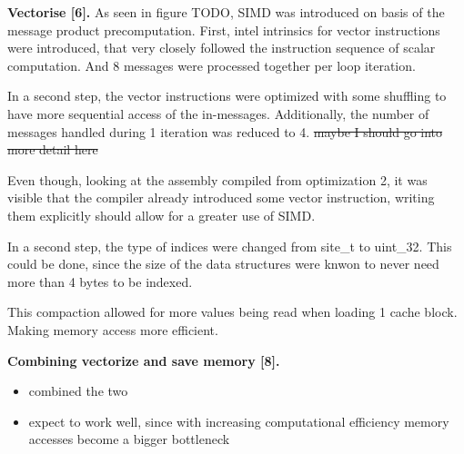 \documentclass[letterpaper]{article}
\newcommand{\mypar}[1]{{\bf #1.}}
\begin{document}
\mypar{Vectorise [6]}
As seen in figure TODO, SIMD was introduced on basis of the message product precomputation. First, intel intrinsics for vector instructions were introduced, that very closely followed the instruction sequence of scalar computation. And 8 messages were processed together per loop iteration.

In a second step, the vector instructions were optimized with some shuffling to have more sequential access of the in-messages. Additionally, the number of messages handled during 1 iteration was reduced to 4. \st{maybe I should go into more detail here}

Even though, looking at the assembly compiled from optimization 2, it was visible that the compiler already introduced some vector instruction, writing them explicitly should allow for a greater use of SIMD.

In a second step, the type of indices were changed from site\_t to uint\_32. This could be done, since the size of the data structures were knwon to never need more than 4 bytes to be indexed.

This compaction allowed for more values being read when loading 1 cache block. Making memory access more efficient.

\mypar{Combining vectorize and save memory [8]}
\begin{itemize}
\item combined the two
\item expect to work well, since with increasing computational efficiency memory accesses become a bigger bottleneck
\end{itemize}
\end{document}
